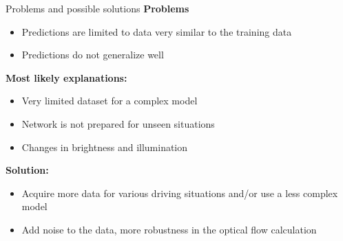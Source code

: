 \begin{frame}{Problems and possible solutions}
	\textbf{Problems}
	\begin{itemize}
		\item Predictions are limited to data very similar to the training data
		\item Predictions do not generalize well
	\end{itemize}
	\textbf{Most likely explanations:}
	\begin{itemize}
		\item Very limited dataset for a complex model
		\item Network is not prepared for unseen situations
		\item Changes in brightness and illumination
	\end{itemize}
	\textbf{Solution:}
	\begin{itemize}
		\item Acquire more data for various driving situations and/or use a less complex model
		\item Add noise to the data, more robustness in the optical flow calculation
	\end{itemize}
\end{frame}

%
%


